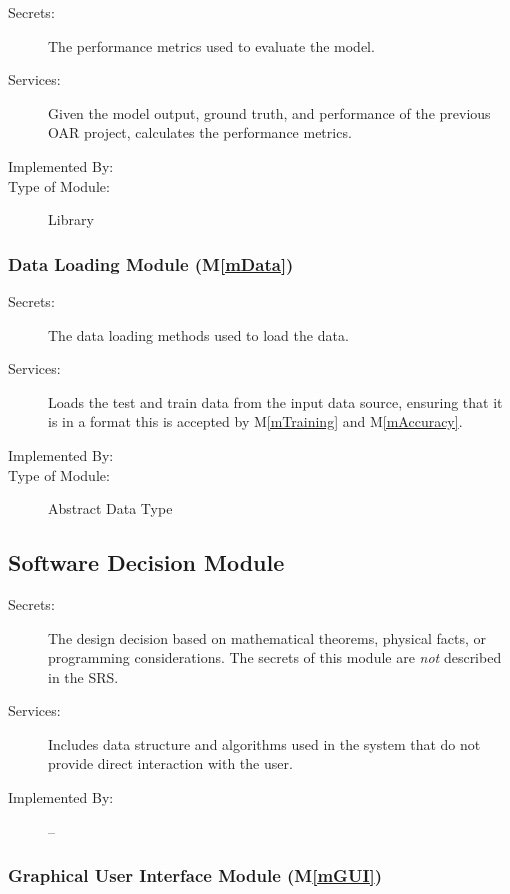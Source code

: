 \documentclass[12pt, titlepage]{article}
\newcommand{\mref}[1]{M\ref{#1}}
\begin{document}
\begin{description}
\item[Secrets:] The performance metrics used to evaluate the model.
\item[Services:] Given the model output, ground truth, and performance of the
previous OAR project, calculates the performance metrics.
\item[Implemented By:] \progname{}
\item[Type of Module:] Library
\end{description}

\subsubsection{Data Loading Module (\mref{mData})}

\begin{description}
\item[Secrets:] The data loading methods used to load the data.
\item[Services:] Loads the test and train data from the input data source,
ensuring that it is in a format this is accepted by \mref{mTraining} and \mref{mAccuracy}.
\item[Implemented By:] \progname{}
\item[Type of Module:] Abstract Data Type
\end{description}

\subsection{Software Decision Module}

\begin{description}
\item[Secrets:] The design decision based on mathematical theorems, physical
  facts, or programming considerations. The secrets of this module are
  \emph{not} described in the SRS.
\item[Services:] Includes data structure and algorithms used in the system that
  do not provide direct interaction with the user. 
\item[Implemented By:] --
\end{description}

\subsubsection{Graphical User Interface Module (\mref{mGUI})}
\end{document}
